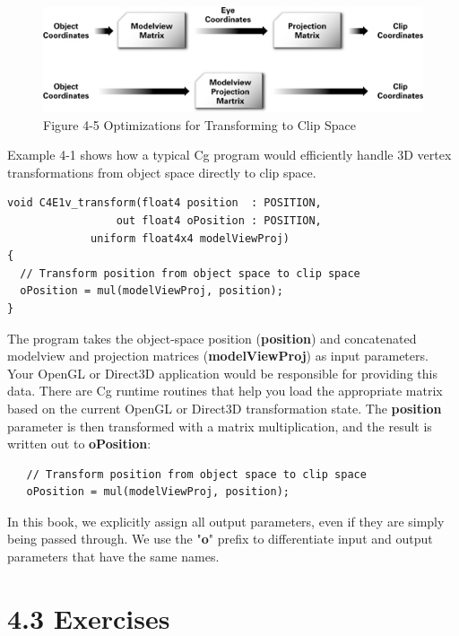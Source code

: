 \documentclass{book}
\begin{document}
\begin{figure}
    \centering
    \includegraphics[width=1\linewidth]{Images/fig4_5.jpg}
    \caption{Figure 4-5 Optimizations for Transforming to Clip Space}
    \label{fig:4-5}
\end{figure}

Example 4-1 shows how a typical Cg program would efficiently handle 3D vertex transformations from object space directly to clip space.

\FloatBarrier
\begin{lstlisting}[caption=Example 4-1. The \textbf{C4E1v_transform} Vertex Program]
void C4E1v_transform(float4 position  : POSITION,
                 out float4 oPosition : POSITION,
             uniform float4x4 modelViewProj)
{
  // Transform position from object space to clip space
  oPosition = mul(modelViewProj, position);
}
\end{lstlisting}
\FloatBarrier

The program takes the object-space position (\textbf{position}) and concatenated modelview and projection matrices (\textbf{modelViewProj}) as input parameters. Your OpenGL or Direct3D application would be responsible for providing this data. There are Cg runtime routines that help you load the appropriate matrix based on the current OpenGL or Direct3D transformation state. The \textbf{position} parameter is then transformed with a matrix multiplication, and the result is written out to \textbf{oPosition}:

\FloatBarrier
\begin{lstlisting}
   // Transform position from object space to clip space
   oPosition = mul(modelViewProj, position);
\end{lstlisting}
\FloatBarrier

In this book, we explicitly assign all output parameters, even if they are simply being passed through. We use the "\textbf{o}" prefix to differentiate input and output parameters that have the same names.

\section{4.3 Exercises}
\end{document}
